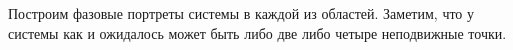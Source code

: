 \documentclass[10pt]{article}
\numberwithin{equation}{section}
\begin{document}
\newpage
Построим фазовые портреты системы в каждой из областей. Заметим, что у системы как и ожидалось может быть либо две либо четыре неподвижные точки.
\begin{figure}[h]
    \centering
    \qquad
    \\

\end{figure}
\end{document}
